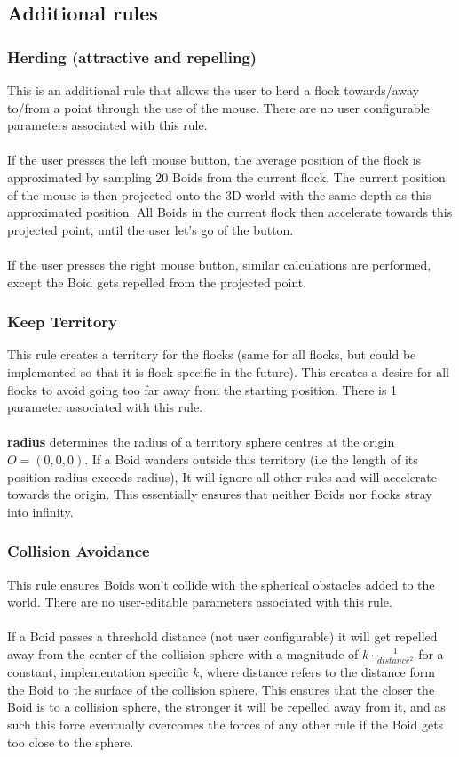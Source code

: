 \documentclass[12pt]{article}
\begin{document}
\subsection{Additional rules}
\subsubsection{Herding (attractive and repelling)}
This is an additional rule that allows the user to herd a flock towards/away to/from a point through the use of the mouse. There are no user configurable parameters associated with this rule.
\\ \\
If the user presses the left mouse button, the average position of the flock is approximated by sampling 20 Boids from the current flock. The current position of the mouse is then projected onto the 3D world with the same depth as this approximated position. All Boids in the current flock then accelerate towards this projected point, until the user let's go of the button.
\\ \\
If the user presses the right mouse button, similar calculations are performed, except the Boid gets repelled from the projected point.
\subsubsection{Keep Territory}
This rule creates a territory for the flocks (same for all flocks, but could be implemented so that it is flock specific in the future). This creates a desire for all flocks to avoid going too far away from the starting position. There is 1 parameter associated with this rule.
\\ \\
\textbf{radius} determines the radius of a territory sphere centres at the origin $O=(0,0,0)$. If a Boid wanders outside this territory (i.e the length of its position radius exceeds radius), It will ignore all other rules and will accelerate towards the origin. This essentially ensures that neither Boids nor flocks stray into infinity.

\subsubsection{Collision Avoidance}
This rule ensures Boids won't collide with the spherical obstacles added to the world. There are no user-editable parameters associated with this  rule.
\\ \\
If a Boid passes a threshold distance (not user configurable) it will get repelled away from the center of the collision sphere with a magnitude of $k\cdot \frac{1}{distance^2}$ for a constant, implementation specific $k$, where distance refers to the distance form the Boid to the surface of the collision sphere. This ensures that the closer the Boid is to a collision sphere, the stronger it will be repelled away from it, and as such this force eventually overcomes the forces of any other rule if the Boid gets too close to the sphere.
\end{document}
